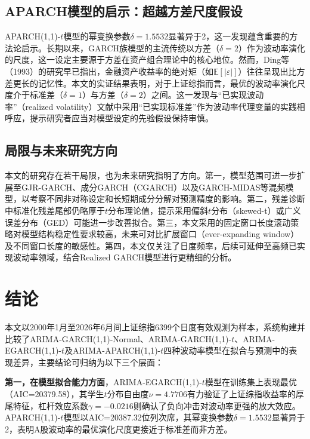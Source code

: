 \documentclass[12pt,a4paper]{ctexart}
\newcommand{\E}{\mathbb{E}}
\begin{document}
\subsection{APARCH模型的启示：超越方差尺度假设}

APARCH(1,1)-$t$模型的幂变换参数$\delta=1.5532$显著异于2，这一发现蕴含重要的方法论启示。长期以来，GARCH族模型的主流传统以方差（$\delta=2$）作为波动率演化的尺度，这一设定主要源于方差在资产组合理论中的核心地位。然而，Ding等（1993）\cite{ding1993}的研究早已指出，金融资产收益率的绝对矩（如$\E[|\varepsilon|]$）往往呈现出比方差更长的记忆性。本文的实证结果表明，对于上证综指而言，最优的波动率演化尺度介于标准差（$\delta=1$）与方差（$\delta=2$）之间。这一发现与“已实现波动率”（realized volatility）文献中采用“已实现标准差”作为波动率代理变量的实践相呼应，提示研究者应当对模型设定的先验假设保持审慎。

\subsection{局限与未来研究方向}

本文的研究存在若干局限，也为未来研究指明了方向。第一，模型范围可进一步扩展至GJR-GARCH\cite{glosten1993}、成分GARCH（CGARCH）以及GARCH-MIDAS等混频模型，以考察不同非对称设定和长短期成分分解对预测精度的影响。第二，残差诊断中标准化残差尾部仍略厚于$t$分布理论值，提示采用偏斜$t$分布（skewed-t）或广义误差分布（GED）可能进一步改善拟合。第三，本文采用的固定窗口长度滚动策略对模型结构稳定性要求较高，未来可对比扩展窗口（ever-expanding window）及不同窗口长度的敏感性。第四，本文仅关注了日度频率，后续可延伸至高频已实现波动率领域，结合Realized GARCH模型\cite{hansen2012}进行更精细的分析。

\section{结论}

本文以2000年1月至2026年6月间上证综指6399个日度有效观测为样本，系统构建并比较了ARIMA-GARCH(1,1)-Normal、ARIMA-GARCH(1,1)-$t$、ARIMA-EGARCH(1,1)-$t$及ARIMA-APARCH(1,1)-$t$四种波动率模型在拟合与预测中的表现差异，主要结论可归纳为以下三个层面：

\textbf{第一，在模型拟合能力方面}，ARIMA-EGARCH(1,1)-$t$模型在训练集上表现最优（AIC=20379.58），其学生$t$分布自由度$\nu=4.7706$有力验证了上证综指收益率的厚尾特征，杠杆效应系数$\gamma=-0.0216$则确认了负向冲击对波动率更强的放大效应。APARCH(1,1)-$t$模型以AIC=20387.32位列次席，其幂变换参数$\delta=1.5532$显著异于2，表明A股波动率的最优演化尺度更接近于标准差而非方差。
\end{document}
